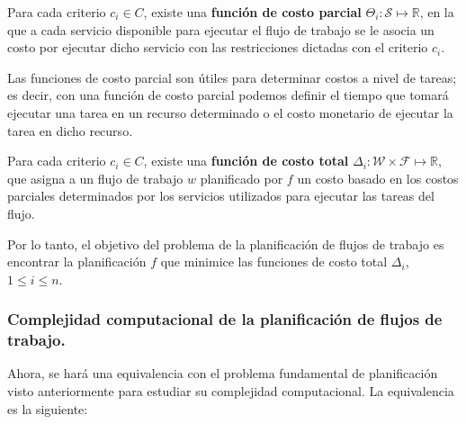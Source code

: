 \begin{defn}
Para cada criterio $c_i \in C$, existe una \textbf{función de costo parcial} $\Theta_i : \mathcal{S} \mapsto \mathbb{R}$, en la que a cada servicio disponible para ejecutar el flujo de trabajo se le asocia un costo por ejecutar dicho servicio con las restricciones dictadas con el criterio $c_i$.
\end{defn}

\noindent Las funciones de costo parcial son útiles para determinar costos a nivel de tareas; es decir, con una función de costo parcial podemos definir el tiempo que tomará ejecutar una tarea en un recurso determinado o el costo monetario de ejecutar la tarea en dicho recurso.

\begin{defn}
Para cada criterio $c_i \in C$, existe una \textbf{función de costo total} $\Delta_i : \mathcal{W} \times \mathcal{F} \mapsto \mathbb{R}$, que asigna a un flujo de trabajo $w$ planificado por $f$ un costo basado en los costos parciales determinados por los servicios utilizados para ejecutar las tareas del flujo.
\end{defn}

\noindent Por lo tanto, el objetivo del problema de la planificación de flujos de trabajo es encontrar la planificación $f$ que minimice las funciones de costo total $\Delta_i$, $1 \le i \le n$.

\subsubsection{Complejidad computacional de la planificación de flujos de trabajo.}
Ahora, se hará una equivalencia con el problema fundamental de planificación visto anteriormente para estudiar su complejidad computacional. La equivalencia es la siguiente:

